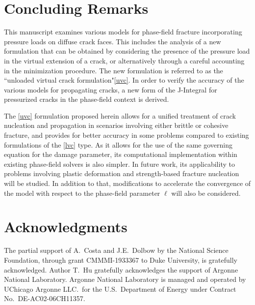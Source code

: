 \section{Concluding Remarks}

This manuscript examines various models for phase-field fracture incorporating pressure loads on diffuse crack faces.  This includes the analysis of a new formulation that can be obtained by considering the presence of the pressure load in the virtual extension of a crack, or alternatively through a careful accounting in the minimization procedure. The new formulation is referred to as the 
 ``unloaded virtual crack formulation"\eqref{uvc}. In order to verify the accuracy of the various models for propagating cracks, a new form of the J-Integral for pressurized cracks in the phase-field context is derived.

The \eqref{uvc} formulation proposed herein allows for a unified treatment of crack nucleation and propagation in scenarios involving either brittle or cohesive fracture, and provides for better accuracy in some problems compared to existing formulations of the \eqref{lvc} type. As it allows for the use of the same governing equation for the damage parameter, its computational implementation within existing phase-field solvers is also simpler. In future work, its applicability to problems involving plastic deformation and strength-based fracture nucleation will be studied. In addition to that, modifications to accelerate the convergence of the model with respect to the phase-field parameter $\ell$ will also be considered.

\section{Acknowledgments}

The partial support of A.\ Costa and  J.E.\ Dolbow by the National Science Foundation, through grant CMMMI-1933367 to Duke University, is gratefully acknowledged.  Author T.\ Hu gratefully acknowledges the support of Argonne National Laboratory.  Argonne National Laboratory is managed and operated by UChicago Argonne LLC.\ for the U.S.\ Department of Energy under Contract No.\ DE-AC02-06CH11357.